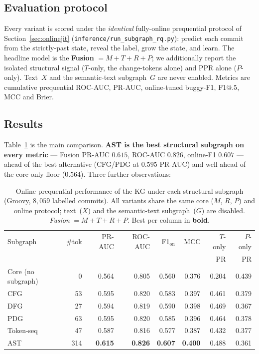 \documentclass[11pt,a4paper]{article}
\newcommand{\code}[1]{\texttt{#1}}
\begin{document}
	\subsection{Evaluation protocol}\label{sec:v4-eval}
	Every variant is scored under the \emph{identical} fully-online prequential
	protocol of Section~\ref{sec:onlinejit} (\code{inference/run\_subgraph\_rq.py}):
	predict each commit from the strictly-past state, reveal the label, grow the
	state, and learn. The headline model is the \textbf{Fusion}
	$=M{+}T{+}R{+}P$; we additionally report the isolated structural signal
	($T$-only, the change-tokens alone) and PPR alone ($P$-only). Text~$X$ and the
	semantic-text subgraph~$G$ are never enabled. Metrics are cumulative
	prequential ROC-AUC, PR-AUC, online-tuned buggy-F1, F1$@.5$, MCC and Brier.

	\subsection{Results}\label{sec:v4-results}
	Table~\ref{tab:v4-results} is the main comparison. \textbf{AST is the best
	structural subgraph on every metric} --- Fusion PR-AUC $0.615$, ROC-AUC $0.826$,
	online-F1 $0.607$ --- ahead of the best alternative (CFG/PDG at $0.595$ PR-AUC)
	and well ahead of the core-only floor ($0.564$). Three further observations:

	\begin{table}[t]
	\centering
	\caption{Online prequential performance of the KG under each structural
	subgraph (Groovy, $8{,}059$ labelled commits). All variants share the same core
	($M$, $R$, $P$) and online protocol; text~($X$) and the semantic-text
	subgraph~($G$) are disabled. \emph{Fusion} $=M{+}T{+}R{+}P$. Best per column in
	\textbf{bold}.}
	\label{tab:v4-results}
	\begin{tabular}{lrrrrrrr}
	\toprule
	Subgraph & \#tok & PR-AUC & ROC-AUC & F1$_{\text{on}}$ & MCC & $T$-only & $P$-only \\
	         &       &        &         &                  &     & PR & PR \\
	\midrule
	Core (no subgraph) & 0 & 0.564 & 0.805 & 0.560 & 0.376 & 0.204 & 0.439 \\
	\midrule
	CFG & 53 & 0.595 & 0.820 & 0.583 & 0.397 & 0.461 & 0.379 \\
	DFG & 27 & 0.594 & 0.819 & 0.590 & 0.398 & 0.469 & 0.367 \\
	PDG & 63 & 0.595 & 0.820 & 0.585 & 0.396 & 0.464 & 0.378 \\
	Token-seq & 47 & 0.587 & 0.816 & 0.577 & 0.387 & 0.432 & 0.377 \\
	\midrule
	AST & 314 & \textbf{0.615} & \textbf{0.826} & \textbf{0.607} & \textbf{0.400} & 0.488 & 0.361 \\
	\bottomrule
	\end{tabular}
	\end{table}
\end{document}
